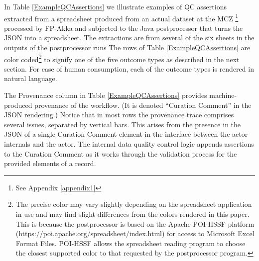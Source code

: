 \documentclass{article}
\begin{document}
In Table  \ref{ExampleQCAssertions}
we illustrate examples of QC assertions extracted from a spreadsheet produced from an actual dataset at the MCZ
\footnote{See Appendix \ref{appendix1}} 
processed by FP-Akka and subjected to the Java postprocessor that turns the JSON into a spreadsheet. 
The extractions are from several of the six sheets in the outputs of  the postprocessor runs
The rows of Table \ref{ExampleQCAssertions} are color coded\footnote{The precise color may vary slightly depending on the spreadsheet application in use and may find slight differences from the colors rendered in this paper. This is because the postprocessor is based on the Apache POI-HSSF platform (https://poi.apache.org/spreadsheet/index.html) for access to Microsoft Excel Format Files. POI-HSSF allows the spreadsheet reading program to choose the closest supported color to that requested by the postprocessor program.} to signify one of the five outcome types as described in the next section. For ease of human consumption, each of the outcome types is rendered in natural language. 




The Provenance column in Table \ref{ExampleQCAssertions} provides machine-produced provenance of the workflow. (It is denoted ``Curation Comment'' in the JSON rendering.) 
 Notice that in most rows the provenance trace comprises several issues, separated by vertical bars.  This arises from the presence in the JSON of a single Curation Comment element in the interface between the actor internals and the actor.  The internal data quality control logic appends assertions to the Curation Comment as it works through the validation process for the provided elements of a record. 
\end{document}
